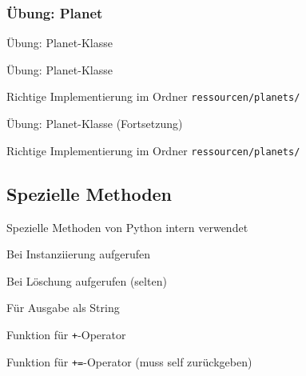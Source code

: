 \subsubsection{Übung: Planet}
\begin{frame}{Übung: Planet-Klasse}
    
\end{frame}
\begin{frame}{Übung: Planet-Klasse}
    
    Richtige Implementierung im Ordner \texttt{ressourcen/planets/}
\end{frame}
\begin{frame}{Übung: Planet-Klasse (Fortsetzung)}
    
    Richtige Implementierung im Ordner \texttt{ressourcen/planets/}
\end{frame}

\subsection{Spezielle Methoden}
\begin{frame}{Spezielle Methoden}
	von Python intern verwendet

	\begin{description}
        \item<1->[\tt\_\_init\_\_] Bei Instanziierung aufgerufen
		\item<2->[\tt\_\_del\_\_] Bei Löschung aufgerufen (selten)
        \item<3->[\tt\_\_str\_\_] Für Ausgabe als String
        \item<4->[\tt\_\_add\_\_] Funktion für \alert{\tt +}-Operator
        \item<5->[\tt\_\_iadd\_\_] Funktion für \alert{\tt +=}-Operator (muss self zurückgeben)
	\end{description}
\end{frame}



